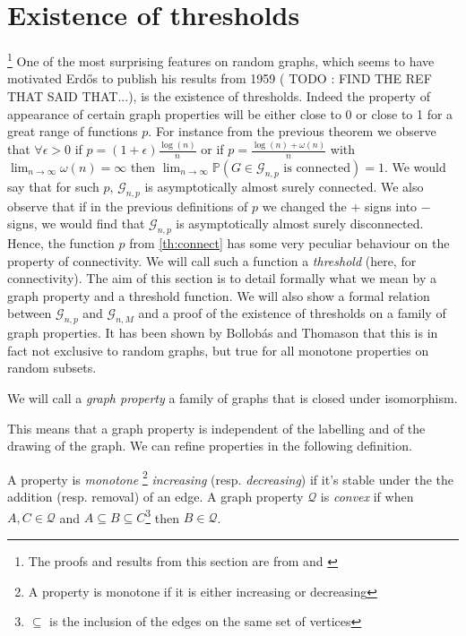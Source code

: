 \section{Existence of thresholds}\footnote{ The proofs and results from this section are from \cite{JLR} and \cite{Bollob01}}
One of the most surprising features on random graphs, which seems to have motivated Erd\H{o}s to publish his results from 1959 ( TODO : FIND THE REF THAT SAID THAT...), is the existence of thresholds.
Indeed the property of appearance of certain graph properties will be either close to 0 or close to 1 for a great range of functions $p$.
\newline
For instance from the previous theorem we observe that $\forall \epsilon > 0$  if $p = (1+\epsilon)\frac{\log(n)}{n}$ 
or if $p = \frac{\log(n) + \omega(n)}{n}$ with $\lim_{n\to \infty} \omega(n) = \infty$ then $\lim_{n\to\infty}\mathbb{P}(G \in \mathcal{G}_{n,p} \text{ is connected}) = 1$.
We would say that for such $p$, $\mathcal{G}_{n,p}$ is asymptotically almost surely connected.
We also observe that if in the previous definitions of $p$ we changed the $+$ signs into $-$ signs, we would find that $\mathcal{G}_{n,p}$ is asymptotically almost surely disconnected.
\newline
Hence, the function $p$ from \eqref{th:connect} has some very peculiar behaviour on the property of connectivity.
We will call such a function a \emph{threshold} (here, for connectivity).
\newline
The aim of this section is to detail formally what we mean by a graph property and a threshold function.
We will also show a formal relation between $\mathcal{G}_{n,p}$ and $\mathcal{G}_{n,M}$ and a proof of the existence of thresholds on a family of graph properties.
\newline
It has been shown by Bollob\'as and Thomason \cite{Bollob87} that this is in fact not exclusive to random graphs, but true for all monotone properties on random subsets.
\begin{definition}
	We will call a \emph{graph property} a family of graphs that is closed under isomorphism.
\end{definition}
This means that a graph property is independent of the labelling and of the drawing of the graph.
We can refine properties in the following definition.
\begin{definition}
	A property is \emph{monotone }\footnote{ A property is monotone if it is either increasing or decreasing} \emph{increasing} (resp. \emph{decreasing}) if it's stable under the the addition (resp. removal) of an edge.
	A graph property $\mathcal{Q}$ is \emph{convex} if when $ A,C \in \mathcal{Q}$ and $A\subseteq B\subseteq C$\footnote{ $\subseteq$ is the inclusion of the edges on the same set of vertices} then $B \in \mathcal{Q}$. 
\end{definition}

